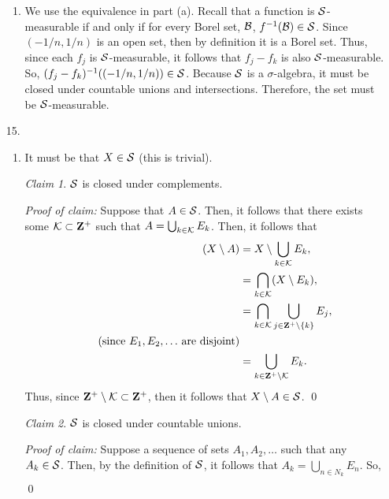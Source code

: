 \documentclass{article}
\theoremstyle{remark}
\newtheorem{claim}{Claim}
\newenvironment{poc}{\textit{Proof of claim:}}{\qed\\}
\begin{document}
\begin{enumerate}[leftmargin=*]
\begin{enumerate}[label=(\alph*)]
        \item We use the equivalence in part (a). Recall that a function is
        $\mathcal{S}$-measurable if and only if for every Borel set, $\mathcal{B}$, $f^{-1}(\mathcal{B})
        \in \mathcal{S}$. Since $(-1/n,1/n)$ is an open set, then by definition it is a
        Borel set. Thus, since each $f_j$ is $\mathcal{S}$-measurable, it follows that
        $f_j - f_k$ is also $\mathcal{S}$-measurable. So, $(f_j - f_k)^{-1}((-1/n, 1/n))
        \in \mathcal{S}$. Because $\mathcal{S}$ is a $\sigma$-algebra, it must be closed under
        countable unions and intersections. Therefore, the set must be
        $\mathcal{S}$-measurable.
    \end{enumerate}
    \item[15.] \begin{enumerate}[label=(\alph*)]
        \item It must be that $X \in \mathcal{S}$ (this is trivial). 
        \begin{claim}
            $\mathcal{S}$ is closed under complements.
        \end{claim}
        \begin{poc}
            Suppose that $A \in \mathcal{S}$. Then, it follows that there exists some
            $\mathcal{K} \subset \mathbf{Z}^+$ such that $A = \bigcup_{k \in \mathcal{K}} E_k$. Then, it
            follows that 
            \begin{align*}
                (X \setminus A) &= X \setminus \bigcup_{k \in \mathcal{K}} E_k, \\
                &= \bigcap_{k \in \mathcal{K}} (X \setminus E_k), \\ 
                &= \bigcap_{k\in \mathcal{K}} \bigcup_{j \in \mathbf{Z}^+ \setminus \{k\}} E_j, \\ \tag{since $E_1,E_2,\ldots$ are disjoint} \\
                &= \bigcup_{k\in \mathbf{Z}^+ \setminus \mathcal{K}} E_k.
            \end{align*}
            Thus, since $\mathbf{Z}^+ \setminus \mathcal{K} \subset \mathbf{Z}^+$, then it follows that
            $X \setminus A \in \mathcal{S}$.
        \end{poc}
        \begin{claim}
            $\mathcal{S}$ is closed under countable unions. 
        \end{claim}
        \begin{poc}
            Suppose a sequence of sets $A_1, A_2,\ldots$ such that any $A_k \in
            \mathcal{S}$. Then, by the definition of $\mathcal{S}$, it follows that $A_k =
            \bigcup_{n \in N_k} E_n$. So,
            \begin{align*}

\end{align*}
\end{poc}
\end{enumerate}
\end{enumerate}
\end{document}
